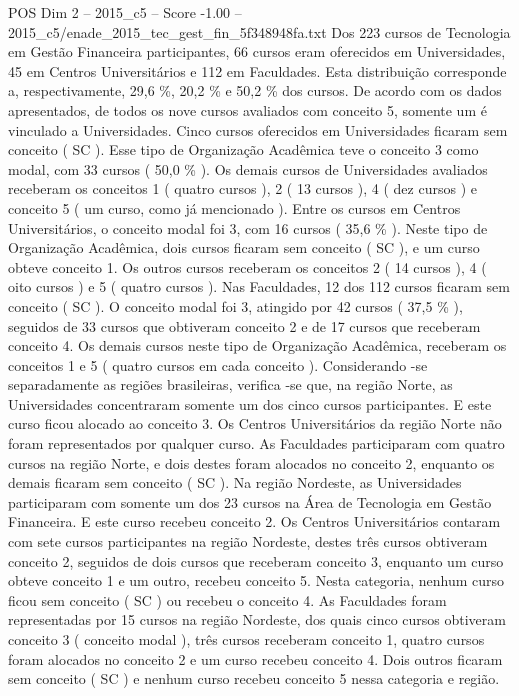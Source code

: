 \begin{textsample}{POS Dim 2 – 2015\_c5 – Score -1.00 – 2015\_c5/enade\_2015\_tec\_gest\_fin\_5f348948fa.txt}
Dos 223 cursos de Tecnologia em Gestão Financeira participantes, 66 cursos eram oferecidos em Universidades, 45 em Centros Universitários e 112 em Faculdades.
Esta distribuição corresponde a, respectivamente, 29,6 \%, 20,2 \% e 50,2 \% dos cursos.
De acordo com os dados apresentados, de todos os nove cursos avaliados com conceito 5, somente um é vinculado a Universidades.
Cinco cursos oferecidos em Universidades ficaram sem conceito ( SC ).
Esse tipo de Organização Acadêmica teve o conceito 3 como modal, com 33 cursos ( 50,0 \% ).
Os demais cursos de Universidades avaliados receberam os conceitos 1 ( quatro cursos ), 2 ( 13 cursos ), 4 ( dez cursos ) e conceito 5 ( um curso, como já mencionado ).
Entre os cursos em Centros Universitários, o conceito modal foi 3, com 16 cursos ( 35,6 \% ).
Neste tipo de Organização Acadêmica, dois cursos ficaram sem conceito ( SC ), e um curso obteve conceito 1.
Os outros cursos receberam os conceitos 2 ( 14 cursos ), 4 ( oito cursos ) e 5 ( quatro cursos ).
Nas Faculdades, 12 dos 112 cursos ficaram sem conceito ( SC ).
O conceito modal foi 3, atingido por 42 cursos ( 37,5 \% ), seguidos de 33 cursos que obtiveram conceito 2 e de 17 cursos que receberam conceito 4.
Os demais cursos neste tipo de Organização Acadêmica, receberam os conceitos 1 e 5 ( quatro cursos em cada conceito ).
Considerando -se separadamente as regiões brasileiras, verifica -se que, na região Norte, as Universidades concentraram somente um dos cinco cursos participantes.
E este curso ficou alocado ao conceito 3.
Os Centros Universitários da região Norte não foram representados por qualquer curso.
As Faculdades participaram com quatro cursos na região Norte, e dois destes foram alocados no conceito 2, enquanto os demais ficaram sem conceito ( SC ).
Na região Nordeste, as Universidades participaram com somente um dos 23 cursos na Área de Tecnologia em Gestão Financeira.
E este curso recebeu conceito 2.
Os Centros Universitários contaram com sete cursos participantes na região Nordeste, destes três cursos obtiveram conceito 2, seguidos de dois cursos que receberam conceito 3, enquanto um curso obteve conceito 1 e um outro, recebeu conceito 5.
Nesta categoria, nenhum curso ficou sem conceito ( SC ) ou recebeu o conceito 4.
As Faculdades foram representadas por 15 cursos na região Nordeste, dos quais cinco cursos obtiveram conceito 3 ( conceito modal ), três cursos receberam conceito 1, quatro cursos foram alocados no conceito 2 e um curso recebeu conceito 4.
Dois outros ficaram sem conceito ( SC ) e nenhum curso recebeu conceito 5 nessa categoria e região.

\end{textsample}
